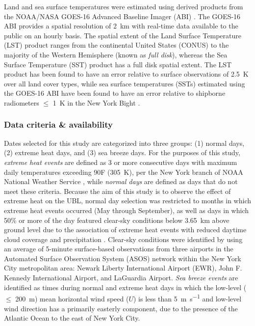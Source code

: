 \documentclass[11pt,a4paper]{article}
\begin{document}
Land and sea surface temperatures were estimated using derived products from the NOAA/NASA GOES-16 Advanced Baseline Imager (ABI) \citep{ignatov2010, yu2008}. The GOES-16 ABI provides a spatial resolution of \SI{2}{\kilo\meter} with real-time data available to the public on an hourly basis. The spatial extent of the Land Surface Temperature (LST) product ranges from the continental United States (CONUS) to the majority of the Western Hemisphere (known as \textit{full disk}), whereas the Sea Surface Temperature (SST) product has a full disk spatial extent. The LST product has been found to have an error relative to surface observations of \SI{2.5}{K} over all land cover types, while sea surface temperatures (SSTs) estimated using the GOES-16 ABI have been found to have an error relative to shipborne radiometers $\leq$ \SI{1}{\kelvin} in the New York Bight \citep{luo2021}.

\subsubsection{Data criteria \& availability}
Dates selected for this study are categorized into three groups: (1) normal days, (2) extreme heat days, and (3) sea breeze days. For the purposes of this study, \textit{extreme heat events} are defined as 3 or more consecutive days with maximum daily temperatures exceeding 90\textdegree F (\SI{305}{\kelvin}), per the New York branch of NOAA National Weather Service \citep{robinson2001, nws2018}, while \textit{normal days} are defined as days that do not meet these criteria. Because the aim of this study is to observe the effect of extreme heat on the UBL, normal day selection was restricted to months in which extreme heat events occurred (May through September), as well as days in which 50\% or more of the day featured clear-sky conditions below \SI{3.65}{\kilo\meter} above ground level due to the association of extreme heat events with reduced daytime cloud coverage and precipitation \citep{stefanon2014, thomas2020}. Clear-sky conditions were identified by using an average of 5-minute surface-based observations from three airports in the Automated Surface Observation System (ASOS) \citep{asos1998} network within the New York City metropolitan area: Newark Liberty International Airport (EWR), John F. Kennedy International Airport, and LaGuardia Airport. \textit{Sea breeze events} are identified as times during normal and extreme heat days in which the low-level ($\leq$ \SI{200}{\meter}) mean horizontal wind speed ($U$) is less than \SI{5}{\meter\per\second} and low-level wind direction has a primarily easterly component, due to the presence of the Atlantic Ocean to the east of New York City.
\end{document}
